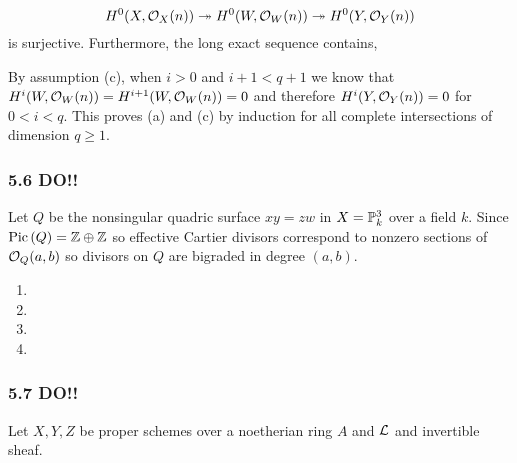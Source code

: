 \documentclass[12pt]{article}
\begin{document}
\[ H^0(X, \struct{X}(n)) \onto H^0(W, \struct{W}(n)) \onto H^0(Y, \struct{Y}(n)) \]
is surjective. Furthermore, the long exact sequence contains,
\begin{center}
\end{center}
By assumption (c), when $i > 0$ and $i+1 < q+1$ we know that $H^i(W, \struct{W}(n)) = H^{i+1}(W, \struct{W}(n)) = 0$ and therefore $H^i(Y, \struct{Y}(n)) = 0$ for $0 < i < q$. This proves (a) and (c) by induction for all complete intersections of dimension $q \ge 1$.  

\subsubsection{5.6 DO!!}

Let $Q$ be the nonsingular quadric surface $xy = zw$ in $X = \P^3_k$ over a field $k$. Since $\Pic{Q} = \Z \oplus \Z$ so effective Cartier divisors correspond to nonzero sections of $\struct{Q}(a,b)$ so divisors on $Q$ are bigraded in degree $(a,b)$.

\begin{enumerate}
\item

\item 

\item 

\item 
\end{enumerate}

\subsubsection{5.7 DO!!}

Let $X, Y, Z$ be proper schemes over a noetherian ring $A$ and $\L$ and invertible sheaf.
\end{document}
